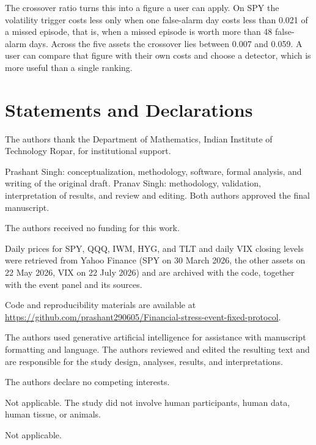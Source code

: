 \documentclass[pdflatex,sn-mathphys-num,iicol]{sn-jnl}
\begin{document}
The crossover ratio turns this into a figure a user can apply. On SPY the volatility trigger costs less only when one false-alarm day costs less than 0.021 of a missed episode, that is, when a missed episode is worth more than 48 false-alarm days. Across the five assets the crossover lies between 0.007 and 0.059. A user can compare that figure with their own costs and choose a detector, which is more useful than a single ranking.

\backmatter

\section*{Statements and Declarations}

The authors thank the Department of Mathematics, Indian Institute of Technology Ropar, for institutional support.

Prashant Singh: conceptualization, methodology, software, formal analysis, and writing of the original draft. Pranav Singh: methodology, validation, interpretation of results, and review and editing. Both authors approved the final manuscript.

The authors received no funding for this work.

Daily prices for SPY, QQQ, IWM, HYG, and TLT and daily VIX closing levels were retrieved from Yahoo Finance (SPY on 30 March 2026, the other assets on 22 May 2026, VIX on 22 July 2026) and are archived with the code, together with the event panel and its sources.

Code and reproducibility materials are available at \url{https://github.com/prashant290605/Financial-stress-event-fixed-protocol}.

The authors used generative artificial intelligence for assistance with manuscript formatting and language. The authors reviewed and edited the resulting text and are responsible for the study design, analyses, results, and interpretations.

The authors declare no competing interests.

Not applicable. The study did not involve human participants, human data, human tissue, or animals.

Not applicable.
\end{document}
